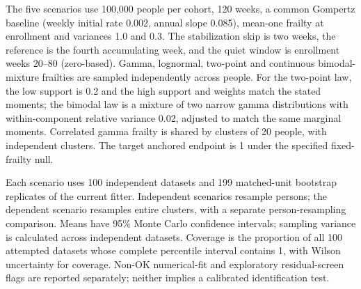 \documentclass[
]{article}
\begin{document}
The five scenarios use 100,000 people per cohort, 120 weeks, a common Gompertz baseline (weekly initial rate 0.002, annual slope 0.085), mean-one frailty at enrollment and variances 1.0 and 0.3. The stabilization skip is two weeks, the reference is the fourth accumulating week, and the quiet window is enrollment weeks 20--80 (zero-based). Gamma, lognormal, two-point and continuous bimodal-mixture frailties are sampled independently across people. For the two-point law, the low support is 0.2 and the high support and weights match the stated moments; the bimodal law is a mixture of two narrow gamma distributions with within-component relative variance 0.02, adjusted to match the same marginal moments. Correlated gamma frailty is shared by clusters of 20 people, with independent clusters. The target anchored endpoint is 1 under the specified fixed-frailty null.

Each scenario uses 100 independent datasets and 199 matched-unit bootstrap replicates of the current fitter. Independent scenarios resample persons; the dependent scenario resamples entire clusters, with a separate person-resampling comparison. Means have 95\% Monte Carlo confidence intervals; sampling variance is calculated across independent datasets. Coverage is the proportion of all 100 attempted datasets whose complete percentile interval contains 1, with Wilson uncertainty for coverage. Non-OK numerical-fit and exploratory residual-screen flags are reported separately; neither implies a calibrated identification test.
\end{document}
